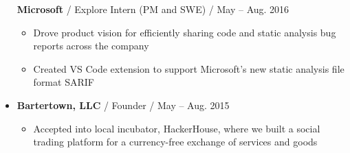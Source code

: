 \documentclass[letterpaper,10pt]{article}
\makeatletter
\newcommand{\resitem}[1]{\item #1 \vspace{-3pt}}
\newcommand{\ressubheading}[4]{
\begin{tabular*}{7.0in}{l@{\extracolsep{\fill}}r}
		\textbf{#1} & #2 \\
		\textit{#3} & \textit{#4} \\
\end{tabular*}\vspace{-6pt}}
\newcommand{\singlesubheading}[3]{ \textbf{#1} / #2 / #3 \vspace{-2pt}}
\makeatother
\begin{document}
\begin{itemize}
	\singlesubheading{Microsoft}{Explore Intern (PM and SWE)}{May -- Aug. 2016}
    \begin{itemize}
        \resitem{Drove product vision for efficiently sharing code and static analysis bug reports across the company}
		\resitem{Created VS Code extension to support Microsoft's new static analysis file format SARIF}
    \end{itemize}
\item[]
	\singlesubheading{Bartertown, LLC}{Founder}{May -- Aug. 2015}
    \begin{itemize}
        \resitem{Accepted into local incubator, HackerHouse, where we built a social trading platform for a currency-free exchange of services and goods}
    \end{itemize}
\end{itemize}
\end{document}
